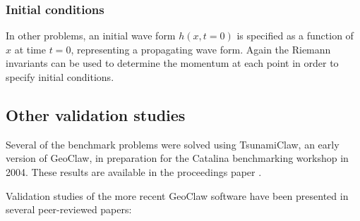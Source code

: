 \subsubsection{Initial conditions}\label{sec:ic}
In other problems, an initial wave form $h(x,t=0)$ is specified as a
function of $x$ at time $t=0$, representing a propagating wave form.
Again the Riemann invariants can be used to
determine the momentum at each point in order to specify initial
conditions.



\subsection{Other validation studies}

Several of the benchmark problems were solved using TsunamiClaw, an early
version of GeoClaw, in preparation for the Catalina
benchmarking workshop in 2004.  These results are available in the
proceedings paper \cite{rjl-george:catalina04a}.

Validation studies of the more 
recent GeoClaw software have been presented in several
peer-reviewed papers:

